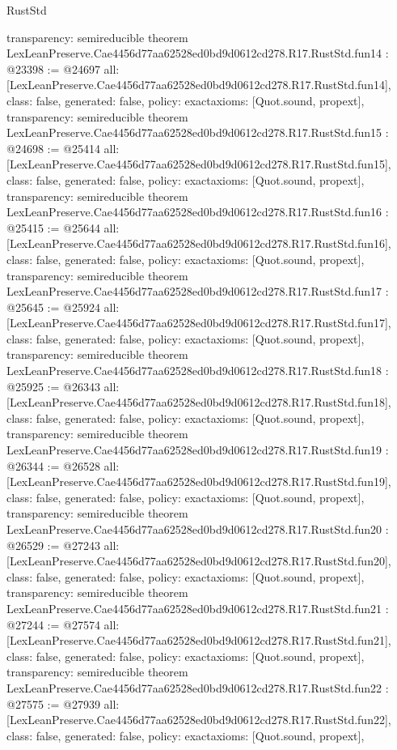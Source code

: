 \begin{lexlean}{RustStd}
\begin{coremodule}
{  transparency: semireducible
}
theorem LexLeanPreserve.Cae4456d77aa62528ed0bd9d0612cd278.R17.RustStd.fun14 : @23398 := @24697 {
  all: [LexLeanPreserve.Cae4456d77aa62528ed0bd9d0612cd278.R17.RustStd.fun14],
  class: false,
  generated: false,
  policy: exact{axioms: [Quot.sound, propext]},
  transparency: semireducible
}
theorem LexLeanPreserve.Cae4456d77aa62528ed0bd9d0612cd278.R17.RustStd.fun15 : @24698 := @25414 {
  all: [LexLeanPreserve.Cae4456d77aa62528ed0bd9d0612cd278.R17.RustStd.fun15],
  class: false,
  generated: false,
  policy: exact{axioms: [Quot.sound, propext]},
  transparency: semireducible
}
theorem LexLeanPreserve.Cae4456d77aa62528ed0bd9d0612cd278.R17.RustStd.fun16 : @25415 := @25644 {
  all: [LexLeanPreserve.Cae4456d77aa62528ed0bd9d0612cd278.R17.RustStd.fun16],
  class: false,
  generated: false,
  policy: exact{axioms: [Quot.sound, propext]},
  transparency: semireducible
}
theorem LexLeanPreserve.Cae4456d77aa62528ed0bd9d0612cd278.R17.RustStd.fun17 : @25645 := @25924 {
  all: [LexLeanPreserve.Cae4456d77aa62528ed0bd9d0612cd278.R17.RustStd.fun17],
  class: false,
  generated: false,
  policy: exact{axioms: [Quot.sound, propext]},
  transparency: semireducible
}
theorem LexLeanPreserve.Cae4456d77aa62528ed0bd9d0612cd278.R17.RustStd.fun18 : @25925 := @26343 {
  all: [LexLeanPreserve.Cae4456d77aa62528ed0bd9d0612cd278.R17.RustStd.fun18],
  class: false,
  generated: false,
  policy: exact{axioms: [Quot.sound, propext]},
  transparency: semireducible
}
theorem LexLeanPreserve.Cae4456d77aa62528ed0bd9d0612cd278.R17.RustStd.fun19 : @26344 := @26528 {
  all: [LexLeanPreserve.Cae4456d77aa62528ed0bd9d0612cd278.R17.RustStd.fun19],
  class: false,
  generated: false,
  policy: exact{axioms: [Quot.sound, propext]},
  transparency: semireducible
}
theorem LexLeanPreserve.Cae4456d77aa62528ed0bd9d0612cd278.R17.RustStd.fun20 : @26529 := @27243 {
  all: [LexLeanPreserve.Cae4456d77aa62528ed0bd9d0612cd278.R17.RustStd.fun20],
  class: false,
  generated: false,
  policy: exact{axioms: [Quot.sound, propext]},
  transparency: semireducible
}
theorem LexLeanPreserve.Cae4456d77aa62528ed0bd9d0612cd278.R17.RustStd.fun21 : @27244 := @27574 {
  all: [LexLeanPreserve.Cae4456d77aa62528ed0bd9d0612cd278.R17.RustStd.fun21],
  class: false,
  generated: false,
  policy: exact{axioms: [Quot.sound, propext]},
  transparency: semireducible
}
theorem LexLeanPreserve.Cae4456d77aa62528ed0bd9d0612cd278.R17.RustStd.fun22 : @27575 := @27939 {
  all: [LexLeanPreserve.Cae4456d77aa62528ed0bd9d0612cd278.R17.RustStd.fun22],
  class: false,
  generated: false,
  policy: exact{axioms: [Quot.sound, propext]},
}
\end{coremodule}
\end{lexlean}
